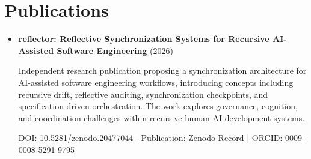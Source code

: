 %

\section{Publications}

\begin{itemize}
\item \textbf{reflector: Reflective Synchronization Systems for Recursive AI-Assisted Software Engineering} (2026)

Independent research publication proposing a synchronization architecture for AI-assisted software engineering workflows, introducing concepts including recursive drift, reflective auditing, synchronization checkpoints, and specification-driven orchestration. The work explores governance, cognition, and coordination challenges within recursive human-AI development systems.

DOI:
\href{https://doi.org/10.5281/zenodo.20477044}{10.5281/zenodo.20477044}
\hspace{0.5em}|\hspace{0.5em}
Publication:
\href{https://zenodo.org/records/20477045}{Zenodo Record}
\hspace{0.5em}|\hspace{0.5em}
ORCID:
\href{https://orcid.org/0009-0008-5291-9795}{0009-0008-5291-9795}
\end{itemize}
